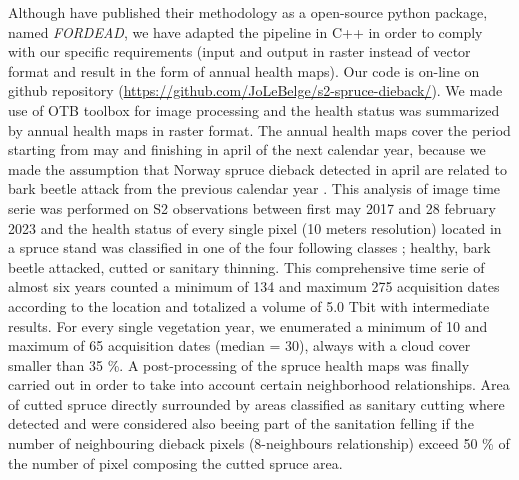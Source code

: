 \documentclass[3p,procedia]{elsarticle}
\begin{document}
Although \cite{dutrieux_package_2021} have published their methodology as a open-source python package, named \textit{FORDEAD}, we have adapted the pipeline in C++ in order to comply with our specific requirements (input and output in raster instead of vector format and result in the form of annual health maps).
Our code is on-line on github repository (\url{https://github.com/JoLeBelge/s2-spruce-dieback/}).
We made use of OTB toolbox \citep{grizonnet_2017_OTB} for image processing and the health status was summarized by annual health maps in raster format.
The annual health maps cover the period starting from may and finishing in april of the next calendar year, because we made the assumption that Norway spruce dieback detected in april are related to bark beetle attack from the previous calendar year \citep{muller_features_2022}.
This analysis of image time serie was performed on S2 observations between first may 2017 and 28 february 2023 and the health status of every single pixel (10 meters resolution) located in a spruce stand was classified in one of the four following classes ; healthy, bark beetle attacked, cutted or sanitary thinning.
This comprehensive time serie of almost six years counted a minimum of 134 and maximum 275 acquisition dates according to the location and totalized a volume of 5.0 Tbit with intermediate results.
For every single vegetation year, we enumerated a minimum of 10 and maximum of 65 acquisition dates (median = 30), always with a cloud cover smaller than 35 \%.
A post-processing of the spruce health maps was finally carried out in order to take into account certain neighborhood relationships. 
Area of cutted spruce directly surrounded by areas classified as sanitary cutting where detected and were considered also beeing part of the sanitation felling if the number of neighbouring dieback pixels (8-neighbours relationship) exceed 50 \% of the number of pixel composing the cutted spruce area.
\end{document}

